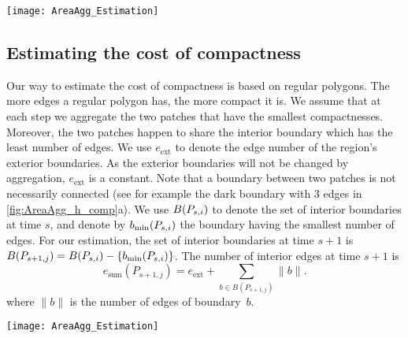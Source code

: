 \begin{figure*}[tb]
	\centering
	\texttt{[image: AreaAgg\_Estimation]}
	\caption{An ``aggregation sequence'' for computing 
		$h_{\mathrm{type}}$, 
		based on the aggregation result of 
		\fig\ref{fig:AreaAgg_FirstStep}b}
	\label{fig:AreaAgg_h_type}
\end{figure*}








\subsection{Estimating the cost of compactness}
\label{sec:AreaAgg_h_comp}

Our way to estimate the cost of compactness 
is based on regular polygons.
The more edges a regular polygon has, the more compact it is.
We assume that at each step 
we aggregate the two patches that have the smallest 
compactnesses.
Moreover, the two patches happen to share the interior boundary 
which has the least number of edges.
We use $e_\mathrm{ext}$ to 
denote the edge number of the region's exterior boundaries.
As the exterior boundaries will not be changed by aggregation, 
$e_\mathrm{ext}$ 
is a constant. 
%
Note that a boundary between two patches is not necessarily 
connected 
(see for example the dark boundary with $3$ edges in
\fig\ref{fig:AreaAgg_h_comp}a).
We use $B(P_{s,i})$ to denote the set of interior boundaries at 
time $s$,
and denote by $b_\mathrm{min}(P_{s,i})$ 
the boundary having the smallest number of edges.
For our estimation, the set of interior boundaries at time $s+1$ 
is
$B(P_{s+1,j})= B(P_{s,i})-{\{b_\mathrm{min}(P_{s,i})\}}$. 
%
The number of interior edges at time $s+1$ is
\begin{equation}
\label{eq:LeftEdgeNum}
e_\mathrm{sum}(P_{s+1,j})=e_\mathrm{ext} + \sum_{b \in 
B(P_{s+1,j})} \|b\|.
\end{equation}
where $\|b\|$ is the number of edges of boundary~$b$.

\begin{figure*}[tb]
	\centering
	\texttt{[image: AreaAgg\_Estimation]}
	\label{fig:AreaAgg_h_comp}
\end{figure*}


